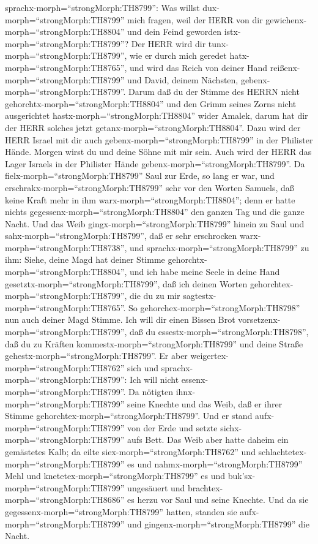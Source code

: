 sprachx-morph=``strongMorph:TH8799'': Was willst
dux-morph=``strongMorph:TH8799'' mich fragen, weil der HERR von dir
gewichenx-morph=``strongMorph:TH8804'' und dein Feind geworden
istx-morph=``strongMorph:TH8799''?  Der HERR wird dir
tunx-morph=``strongMorph:TH8799'', wie er durch mich geredet
hatx-morph=``strongMorph:TH8765'', und wird das Reich von deiner Hand
reißenx-morph=``strongMorph:TH8799'' und David, deinem Nächsten,
gebenx-morph=``strongMorph:TH8799''.  Darum daß du der
Stimme des HERRN nicht gehorchtx-morph=``strongMorph:TH8804'' und den
Grimm seines Zorns nicht ausgerichtet hastx-morph=``strongMorph:TH8804''
wider Amalek, darum hat dir der HERR solches jetzt
getanx-morph=``strongMorph:TH8804''.  Dazu wird der HERR
Israel mit dir auch gebenx-morph=``strongMorph:TH8799'' in der Philister
Hände. Morgen wirst du und deine Söhne mit mir sein. Auch wird der HERR
das Lager Israels in der Philister Hände
gebenx-morph=``strongMorph:TH8799''.  Da
fielx-morph=``strongMorph:TH8799'' Saul zur Erde, so lang er war, und
erschrakx-morph=``strongMorph:TH8799'' sehr vor den Worten Samuels, daß
keine Kraft mehr in ihm warx-morph=``strongMorph:TH8804''; denn er hatte
nichts gegessenx-morph=``strongMorph:TH8804'' den ganzen Tag und die
ganze Nacht.  Und das Weib
gingx-morph=``strongMorph:TH8799'' hinein zu Saul und
sahx-morph=``strongMorph:TH8799'', daß er sehr erschrocken
warx-morph=``strongMorph:TH8738'', und
sprachx-morph=``strongMorph:TH8799'' zu ihm: Siehe, deine Magd hat
deiner Stimme gehorchtx-morph=``strongMorph:TH8804'', und ich habe meine
Seele in deine Hand gesetztx-morph=``strongMorph:TH8799'', daß ich
deinen Worten gehorchtex-morph=``strongMorph:TH8799'', die du zu mir
sagtestx-morph=``strongMorph:TH8765''.  So
gehorchex-morph=``strongMorph:TH8798'' nun auch deiner Magd Stimme. Ich
will dir einen Bissen Brot vorsetzenx-morph=``strongMorph:TH8799'', daß
du essestx-morph=``strongMorph:TH8798'', daß du zu Kräften
kommestx-morph=``strongMorph:TH8799'' und deine Straße
gehestx-morph=``strongMorph:TH8799''.  Er aber
weigertex-morph=``strongMorph:TH8762'' sich und
sprachx-morph=``strongMorph:TH8799'': Ich will nicht
essenx-morph=``strongMorph:TH8799''. Da nötigten
ihnx-morph=``strongMorph:TH8799'' seine Knechte und das Weib, daß er
ihrer Stimme gehorchtex-morph=``strongMorph:TH8799''. Und er stand
aufx-morph=``strongMorph:TH8799'' von der Erde und setzte
sichx-morph=``strongMorph:TH8799'' aufs Bett.  Das Weib
aber hatte daheim ein gemästetes Kalb; da eilte
siex-morph=``strongMorph:TH8762'' und
schlachtetex-morph=``strongMorph:TH8799'' es und
nahmx-morph=``strongMorph:TH8799'' Mehl und
knetetex-morph=``strongMorph:TH8799'' es und
buk'sx-morph=``strongMorph:TH8799'' ungesäuert  und
brachtex-morph=``strongMorph:TH8686'' es herzu vor Saul und seine
Knechte. Und da sie gegessenx-morph=``strongMorph:TH8799'' hatten,
standen sie aufx-morph=``strongMorph:TH8799'' und
gingenx-morph=``strongMorph:TH8799'' die Nacht.

